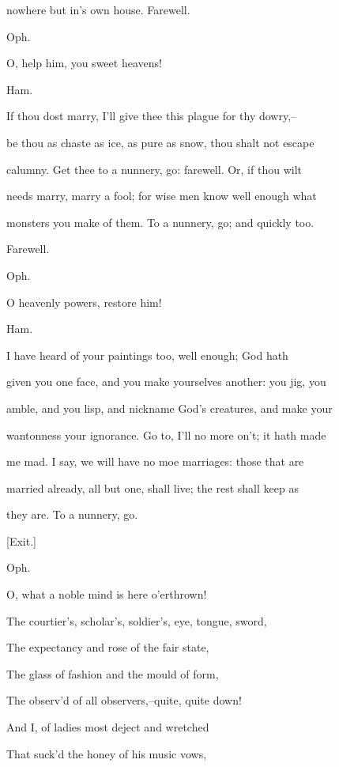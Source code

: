 \documentclass[12pt]{book}
\begin{document}
nowhere but in's own house. Farewell.



Oph.

O, help him, you sweet heavens!



Ham.

If thou dost marry, I'll give thee this plague for thy dowry,--

be thou as chaste as ice, as pure as snow, thou shalt not escape

calumny. Get thee to a nunnery, go: farewell. Or, if thou wilt

needs marry, marry a fool; for wise men know well enough what

monsters you make of them. To a nunnery, go; and quickly too.

Farewell.



Oph.

O heavenly powers, restore him!



Ham.

I have heard of your paintings too, well enough; God hath

given you one face, and you make yourselves another: you jig, you

amble, and you lisp, and nickname God's creatures, and make your

wantonness your ignorance. Go to, I'll no more on't; it hath made

me mad. I say, we will have no moe marriages: those that are

married already, all but one, shall live; the rest shall keep as

they are. To a nunnery, go.



[Exit.]



Oph.

O, what a noble mind is here o'erthrown!

The courtier's, scholar's, soldier's, eye, tongue, sword,

The expectancy and rose of the fair state,

The glass of fashion and the mould of form,

The observ'd of all observers,--quite, quite down!

And I, of ladies most deject and wretched

That suck'd the honey of his music vows,
\end{document}
